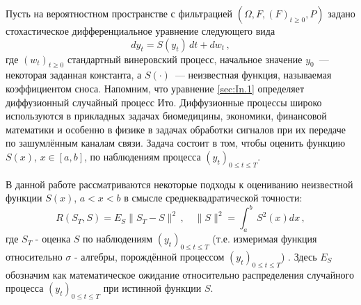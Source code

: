 




Пусть на вероятностном пространстве с фильтрацией $(\Omega, F, (F)_{t\geqslant 0}, P)$ задано стохастическое дифференциальное уравнение следующего вида
 \begin{equation}\label{sec:In.1}
d y_{t}=S(y_{t})\,d t +d w_{t}\,,
 \end{equation}
где $(w_{t})_{t\geqslant 0}$ стандартный винеровский процесс,
начальное значение $y_{0}$~--- некоторая заданная константа,
а $S(\cdot)$~--- неизвестная функция, называемая коэффициентом сноса.
Напомним, что уравнение \eqref{sec:In.1} определяет диффузионный случайный процесс Ито.
Диффузионные процессы широко используются в прикладных задачах биомедицины, экономики, финансовой математики и особенно в физике в задачах обработки сигналов при их передаче по зашумлённым каналам связи.
Задача состоит в том, чтобы оценить функцию $S(x)$, $x\in[a,b]$, по наблюдениям процесса
$(y_{t})_{0\leqslant t\leqslant T}$.

В данной работе рассматриваются некоторые подходы к оцениванию неизвестной функции $S(x)$, $a<x<b$ в смысле среднеквадратической точности:
\begin{equation}\label{sec:In.2}
R({S}_{T},S)=E_{S}\|{S}_{T}-S\|^2\,,
\quad
\|S\|^2=\int^b_{a}\,S^2(x)d x\,,
\end{equation}
где ${S}_{T}$ - оценка
$S$ по наблюдениям $(y_{t})_{0\leqslant t\leqslant T}$ (т.е. измеримая функция относительно $\sigma$ - алгебры, порождённой процессом $(y_{t})_{0\leqslant t\leqslant T}$) . Здесь $E_{S}$ обозначим как математическое ожидание относительно распределения случайного процесса
 $(y_{t})_{0\leqslant t\leqslant T}$ при истинной функции $S$.

